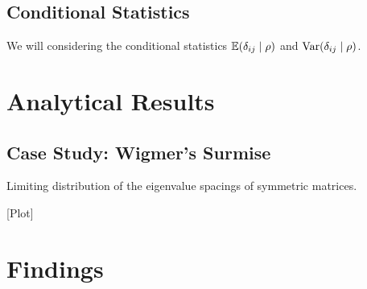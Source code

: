 \subsection{Conditional Statistics}

We will considering the conditional statistics $\mathbb{E}(\delta_{ij} \mid \rho)$ and $\text{Var}(\delta_{ij} \mid \rho)$.


\section{Analytical Results}


\subsection{Case Study: Wigmer's Surmise}

Limiting distribution of the eigenvalue spacings of symmetric matrices.

[Plot]


\section{Findings}
